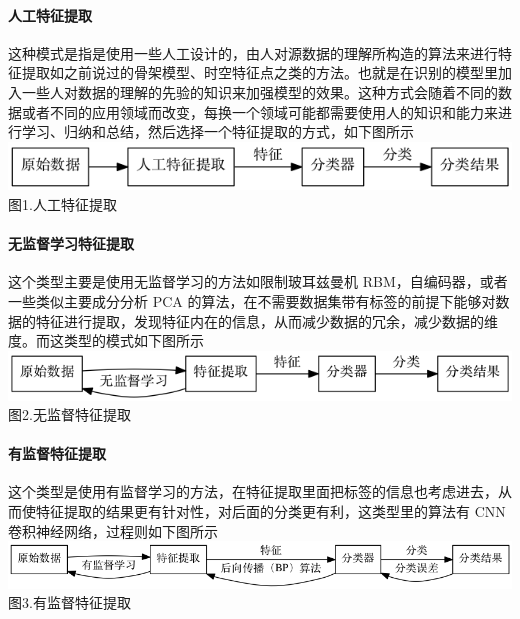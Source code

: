 \paragraph{人工特征提取}\label{ux4ebaux5de5ux7279ux5f81ux63d0ux53d6}

这种模式是指是使用一些人工设计的，由人对源数据的理解所构造的算法来进行特征提取如之前说过的骨架模型、时空特征点之类的方法。也就是在识别的模型里加入一些人对数据的理解的先验的知识来加强模型的效果。这种方式会随着不同的数据或者不同的应用领域而改变，每换一个领域可能都需要使用人的知识和能力来进行学习、归纳和总结，然后选择一个特征提取的方式，如下图所示\\\includegraphics{picture/learning-framework1.png}\\图1.人工特征提取

\paragraph{无监督学习特征提取}\label{ux65e0ux76d1ux7763ux5b66ux4e60ux7279ux5f81ux63d0ux53d6}

这个类型主要是使用无监督学习的方法如限制玻耳兹曼机
RBM，自编码器，或者一些类似主要成分分析 PCA
的算法，在不需要数据集带有标签的前提下能够对数据的特征进行提取，发现特征内在的信息，从而减少数据的冗余，减少数据的维度。而这类型的模式如下图所示\\\includegraphics{picture/learning-framework2.png}\\图2.无监督特征提取

\paragraph{有监督特征提取}\label{ux6709ux76d1ux7763ux7279ux5f81ux63d0ux53d6}

这个类型是使用有监督学习的方法，在特征提取里面把标签的信息也考虑进去，从而使特征提取的结果更有针对性，对后面的分类更有利，这类型里的算法有
CNN
卷积神经网络，过程则如下图所示\\\includegraphics{picture/learning-framework3.png}\\图3.有监督特征提取

